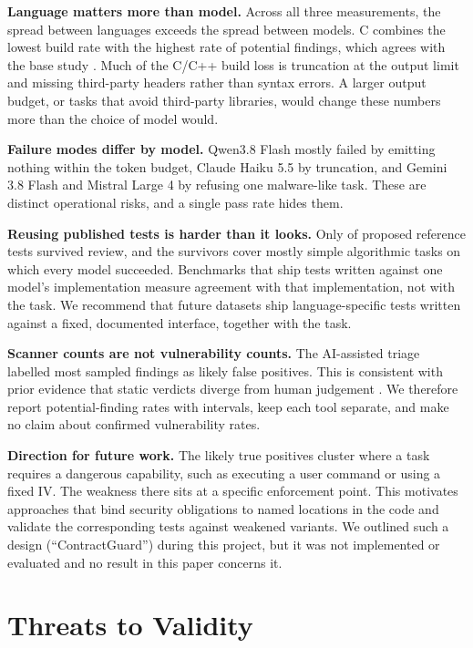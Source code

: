 \documentclass[conference]{IEEEtran}
\begin{document}
\textbf{Language matters more than model.} Across all three measurements, the
spread between languages exceeds the spread between models. C combines the
lowest build rate with the highest rate of potential findings, which agrees with
the base study \cite{kharma2026}. Much of the C/C++ build loss is truncation at
the output limit and missing third-party headers rather than syntax errors. A
larger output budget, or tasks that avoid third-party libraries, would change
these numbers more than the choice of model would.

\textbf{Failure modes differ by model.} Qwen3.8 Flash mostly failed by emitting
nothing within the token budget, Claude Haiku 5.5 by truncation, and Gemini 3.8
Flash and Mistral Large 4 by refusing one malware-like task. These are distinct
operational risks, and a single pass rate hides them.

\textbf{Reusing published tests is harder than it looks.} Only
\nOracleApproved{} of \nOracleProposed{} proposed reference tests survived
review, and the survivors cover mostly simple algorithmic tasks on which every
model succeeded. Benchmarks that ship tests written against one model's
implementation measure agreement with that implementation, not with the task.
We recommend that future datasets ship language-specific tests written against
a fixed, documented interface, together with the task.

\textbf{Scanner counts are not vulnerability counts.} The AI-assisted triage
labelled most sampled findings as likely false positives. This is consistent
with prior evidence that static verdicts diverge from human judgement
\cite{tessa2026,firouzi2026}. We therefore report potential-finding rates with
intervals, keep each tool separate, and make no claim about confirmed
vulnerability rates.

\textbf{Direction for future work.} The likely true positives cluster where a
task requires a dangerous capability, such as executing a user command or
using a fixed IV. The weakness there sits at a specific enforcement point. This
motivates approaches that bind security obligations to named locations in the
code and validate the corresponding tests against weakened variants. We
outlined such a design (``ContractGuard'') during this project, but it was not
implemented or evaluated and no result in this paper concerns it.

\section{Threats to Validity}
\end{document}

